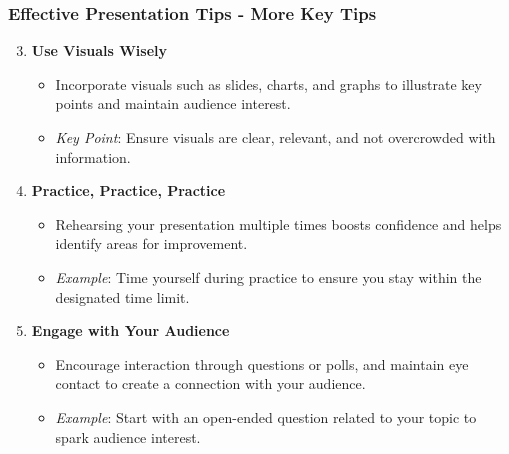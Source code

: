 \documentclass[aspectratio=169]{beamer}
\begin{document}
\begin{frame}[fragile]
    \frametitle{Effective Presentation Tips - More Key Tips}
    \begin{enumerate}\setcounter{enumi}{2}
        \item \textbf{Use Visuals Wisely} \\
        \begin{itemize}
            \item Incorporate visuals such as slides, charts, and graphs to illustrate key points and maintain audience interest.
            \item \textit{Key Point}: Ensure visuals are clear, relevant, and not overcrowded with information.
        \end{itemize}

        \item \textbf{Practice, Practice, Practice} \\
        \begin{itemize}
            \item Rehearsing your presentation multiple times boosts confidence and helps identify areas for improvement.
            \item \textit{Example}: Time yourself during practice to ensure you stay within the designated time limit.
        \end{itemize}

        \item \textbf{Engage with Your Audience} \\
        \begin{itemize}
            \item Encourage interaction through questions or polls, and maintain eye contact to create a connection with your audience.
            \item \textit{Example}: Start with an open-ended question related to your topic to spark audience interest.
        \end{itemize}
    \end{enumerate}
\end{frame}
\end{document}
